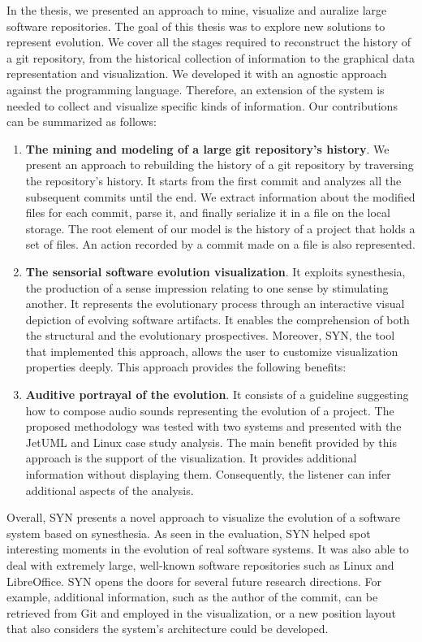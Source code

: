 \documentclass[11pt,twoside,english,singlespacing,headsepline,consistentlayout]{auxiliary/si-msc-thesis}
\begin{document}
In the thesis, we presented an approach to mine, visualize and auralize large software repositories. The goal of this thesis was to explore new solutions to represent evolution. We cover all the stages required to reconstruct the history of a git repository, from the historical collection of information to the graphical data representation and visualization. We developed it with an agnostic approach against the programming language. Therefore, an extension of the system is needed to collect and visualize specific kinds of information. Our contributions can be summarized as follows:
\begin{enumerate}
    \item \textbf{The mining and modeling of a large git repository's history}. We present an approach to rebuilding the history of a git repository by traversing the repository's history. It starts from the first commit and analyzes all the subsequent commits until the end.
    We extract information about the modified files for each commit, parse it, and finally serialize it in a file on the local storage. The root element of our model is the history of a project that holds a set of files. An action recorded by a commit made on a file is also represented.
    \item \textbf{The sensorial software evolution visualization}. It exploits synesthesia, the production of a sense impression relating to one sense by stimulating another. It represents the evolutionary process through an interactive visual depiction of evolving software artifacts. It enables the comprehension of both the structural and the evolutionary prospectives. Moreover, SYN, the tool that implemented this approach, allows the user to customize visualization properties deeply. This approach provides the following benefits:
    \item \textbf{Auditive portrayal of the evolution}. It consists of a guideline suggesting how to compose audio sounds representing the evolution of a project. The proposed methodology was tested with two systems and presented with the JetUML and Linux case study analysis. The main benefit provided by this approach is the support of the visualization. It provides additional information without displaying them. Consequently, the listener can infer additional aspects of the analysis.
\end{enumerate}  

Overall, SYN presents a novel approach to visualize the evolution of a software system based on synesthesia. As seen in the evaluation, SYN helped spot interesting moments in the evolution of real software systems. It was also able to deal with extremely large, well-known software repositories such as Linux and LibreOffice. SYN opens the doors for several future research directions. For example, additional information, such as the author of the commit, can be retrieved from Git and employed in the visualization, or a new position layout that also considers the system's architecture could be developed. 

\newpage
\small 


\end{document}
